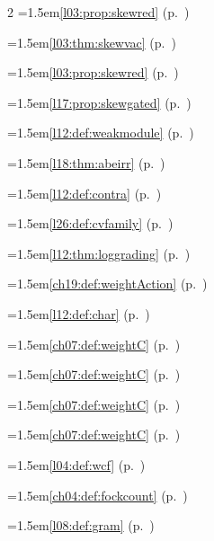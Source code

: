 \begin{multicols}{2}
\hangindent=1.5em\quad \ref{l03:prop:skewred} (p.~\pageref{l03:prop:skewred})\par
\hangindent=1.5em\quad \ref{l03:thm:skewvac} (p.~\pageref{l03:thm:skewvac})\par
\hangindent=1.5em\quad \ref{l03:prop:skewred} (p.~\pageref{l03:prop:skewred})\par
\hangindent=1.5em\quad \ref{l17:prop:skewgated} (p.~\pageref{l17:prop:skewgated})\par
\hangindent=1.5em\quad \ref{l12:def:weakmodule} (p.~\pageref{l12:def:weakmodule})\par
\hangindent=1.5em\quad \ref{l18:thm:abeirr} (p.~\pageref{l18:thm:abeirr})\par
\hangindent=1.5em\quad \ref{l12:def:contra} (p.~\pageref{l12:def:contra})\par
\hangindent=1.5em\quad \ref{l26:def:cvfamily} (p.~\pageref{l26:def:cvfamily})\par
\hangindent=1.5em\quad \ref{l12:thm:loggrading} (p.~\pageref{l12:thm:loggrading})\par
\hangindent=1.5em\quad \ref{ch19:def:weightAction} (p.~\pageref{ch19:def:weightAction})\par
\hangindent=1.5em\quad \ref{l12:def:char} (p.~\pageref{l12:def:char})\par
\hangindent=1.5em\quad \ref{ch07:def:weightC} (p.~\pageref{ch07:def:weightC})\par
\hangindent=1.5em\quad \ref{ch07:def:weightC} (p.~\pageref{ch07:def:weightC})\par
\hangindent=1.5em\quad \ref{ch07:def:weightC} (p.~\pageref{ch07:def:weightC})\par
\hangindent=1.5em\quad \ref{ch07:def:weightC} (p.~\pageref{ch07:def:weightC})\par
\hangindent=1.5em\quad \ref{l04:def:wcf} (p.~\pageref{l04:def:wcf})\par
\hangindent=1.5em\quad \ref{ch04:def:fockcount} (p.~\pageref{ch04:def:fockcount})\par
\hangindent=1.5em\quad \ref{l08:def:gram} (p.~\pageref{l08:def:gram})\par

\end{multicols}
